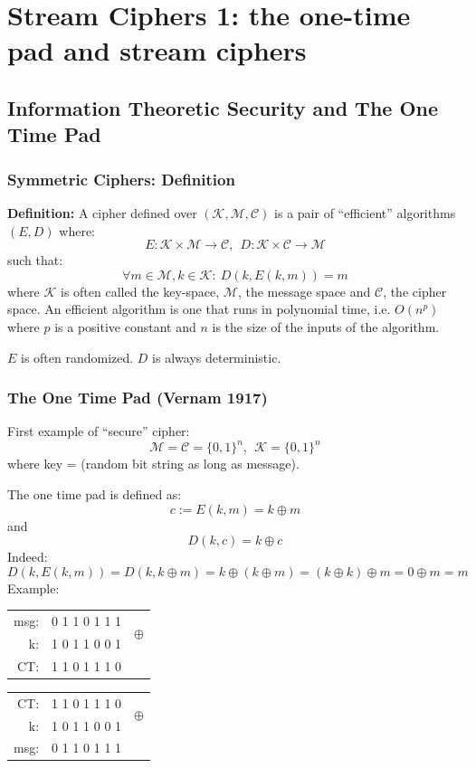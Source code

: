 \documentclass[12pt]{book}
\newcommand{\Def}{\textcolor{dkgreen}{\textbf{Definition:}} }
\begin{document}
\newpage
\section{Stream Ciphers 1: the one-time pad and stream ciphers}
\subsection{Information Theoretic Security and The One Time Pad}
\subsubsection{Symmetric Ciphers: Definition}
\Def A cipher defined over $\left(\mathcal{K}, \mathcal{M},\mathcal{C}\right)$ is a pair of ``efficient'' algorithms $\left(E,D\right)$ where: $$E:\mathcal{K}\times\mathcal{M}\rightarrow\mathcal{C},\ \ D:\mathcal{K}\times\mathcal{C}\rightarrow\mathcal{M}$$ such that: $$\forall m\in\mathcal{M},k\in\mathcal{K}:\ D\left(k,E(k,m)\right)=m$$ where $\mathcal{K}$ is often called the key-space, $\mathcal{M}$, the message space and $\mathcal{C}$, the cipher space. An efficient algorithm is one that runs in polynomial time, i.e. $O(n^{p})$ where $p$ is a positive constant and $n$ is the size of the inputs of the algorithm.

$E$ is often randomized. $D$ is always deterministic.

\subsubsection{The One Time Pad (Vernam 1917)}
First example of ``secure'' cipher: $$\mathcal{M}=\mathcal{C}=\{0,1\}^{n},\ \ \mathcal{K}=\{0,1\}^{n}$$ where key = (random bit string as long as message).

The one time pad is defined as: $$c:=E(k,m)=k\oplus m$$ and $$D(k,c)=k\oplus c$$ Indeed: $$D\left(k,E(k,m)\right)=D(k,k\oplus m)=k\oplus (k\oplus m)=(k\oplus k)\oplus m=0\oplus m=m$$
Example:
\begin{center}
	\begin{tabular}{rcc}
		msg:&0 1 1 0 1 1 1&\multirow{2}{*}{$\oplus$}\\
		k:&1 0 1 1 0 0 1&\\\hline
		CT:&1 1 0 1 1 1 0&
	\end{tabular}\hskip2cm
	\begin{tabular}{rcc}
		CT:&1 1 0 1 1 1 0&\multirow{2}{*}{$\oplus$}\\
		k:&1 0 1 1 0 0 1&\\\hline
		msg:&0 1 1 0 1 1 1&
	\end{tabular}
\end{center}
\end{document}
